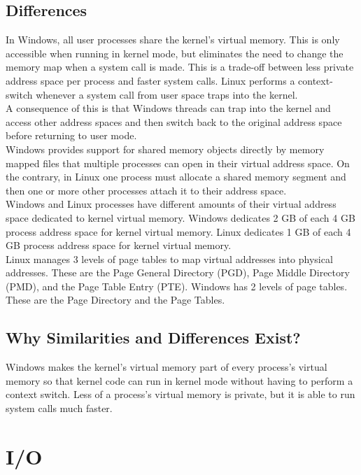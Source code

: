\documentclass[letterpaper,10pt,titlepage]{article}
\begin{document}
\subsection{Differences}
In Windows, all user processes share the kernel's virtual memory. This is only 
accessible when running in kernel mode, but eliminates the need to change the
memory map when a system call is made. This is a trade-off between less private
address space per process and faster system calls. Linux performs a 
context-switch whenever a system call from user space traps into the kernel. 
\\
\linebreak
A consequence of this is that Windows threads can trap into the kernel and 
access other address spaces and then switch back to the original address space
before returning to user mode.
\\
\linebreak
Windows provides support for shared memory objects directly by memory 
mapped files that multiple processes can open in their virtual address space.
On the contrary, in Linux one process must allocate a shared memory segment and
then one or more other processes attach it to their address space.
\\
\linebreak
Windows and Linux processes have different amounts of their virtual address
space dedicated to kernel virtual memory. Windows dedicates 2 GB of each 4 GB
process address space for kernel virtual memory. Linux dedicates 1 GB of each
4 GB process address space for kernel virtual memory.
\\ 
\linebreak
Linux manages 3 levels of page tables to map virtual addresses into physical
addresses. These are the Page General Directory (PGD), Page Middle Directory
(PMD), and the Page Table Entry (PTE). Windows has 2 levels of page tables. 
These are the Page Directory and the Page Tables.
\subsection{Why Similarities and Differences Exist?}
Windows makes the kernel's virtual memory part of every process's virtual 
memory so that kernel code can run in kernel mode without having to perform a 
context switch. Less of a process's virtual memory is private, but it is able
to run system calls much faster. 
\section{I/O}
\end{document}
